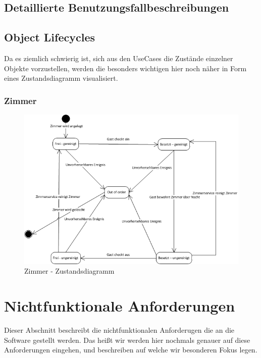 \documentclass[10pt,a4paper,titlepage]{article}
\begin{document}
\subsection{Detaillierte Benutzungsfallbeschreibungen}
















\subsection{Object Lifecycles}
Da es ziemlich schwierig ist, sich aus den UseCases die Zustände einzelner Objekte vorzustellen, werden die besonders wichtigen hier noch näher in Form eines Zustandsdiagramm visualisiert.
\subsubsection{Zimmer}
\begin{figure}[h]
	\includegraphics[width=\linewidth]{Images/Lifecycle_Zimmer.png}
	\caption{Zimmer - Zustandsdiagramm}
\end{figure}

\newpage

\section{Nichtfunktionale Anforderungen}
Dieser Abschnitt beschreibt die nichtfunktionalen Anforderugen die an die Software gestellt werden. Das heißt wir werden hier nochmals genauer auf diese Anforderungen eingehen, und beschreiben auf welche wir besonderen Fokus legen.
\end{document}
